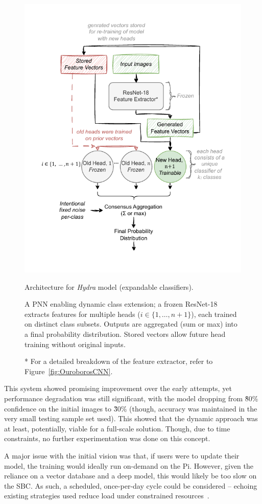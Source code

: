                 \begin{figure}
                    \centering
                    \includegraphics[width=0.75\linewidth]{images/Hydra.pdf}
                    \caption{Architecture for \textit{Hydra} model (expandable classifiers).}
                    \label{fig:HydraCNN}
                    \caption*{
                        A PNN enabling dynamic class extension; a frozen ResNet-18 extracts features for multiple heads (\(i \in \{1, \dots, n+1\}\)), each trained on distinct class subsets. Outputs are aggregated (sum or max) into a final probability distribution. Stored vectors allow future head training without original inputs.
                    }
                    \caption*{* For a detailed breakdown of the feature extractor, refer to Figure~\ref{fig:OuroborosCNN}.}
                \end{figure}
    
                This system showed promising improvement over the early attempts, yet performance degradation was still significant, with the model dropping from \~80\% confidence on the initial images to \~30\% (though, accuracy was maintained in the very small testing sample set used). This showed that the dynamic approach was at least, potentially,  viable for a full-scale solution. Though, due to time constraints, no further experimentation was done on this concept.
    
                A major issue with the initial vision was that, if users were to update their model, the training would ideally run on-demand on the Pi. However, given the reliance on a vector database and a deep model, this would likely be too slow on the SBC. As such, a scheduled, once-per-day cycle could be considered -- echoing existing strategies used reduce load under constrained resources~\cite{gonzalez2019cernbox}.
    
